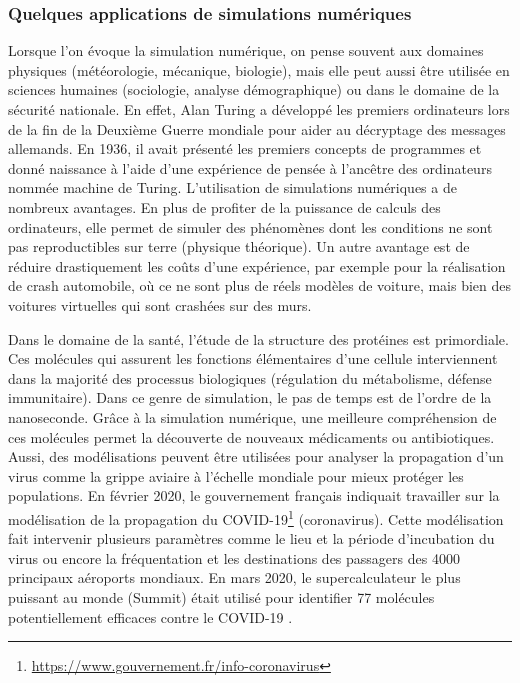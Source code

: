     \subsubsection{Quelques applications de simulations numériques}
        Lorsque l'on évoque la simulation numérique, on pense souvent aux domaines physiques (météorologie, mécanique, biologie), mais elle peut aussi être utilisée en sciences humaines (sociologie, analyse démographique) ou dans le domaine de la sécurité nationale. En effet, Alan Turing a développé les premiers ordinateurs lors de la fin de la Deuxième Guerre mondiale pour aider au décryptage des messages allemands. En 1936, il avait présenté les premiers concepts de programmes et donné naissance à l'aide d'une expérience de pensée à l'ancêtre des ordinateurs nommée machine de Turing. L'utilisation de simulations numériques a de nombreux avantages. En plus de profiter de la puissance de calculs des ordinateurs, elle permet de simuler des phénomènes dont les conditions ne sont pas reproductibles sur terre (physique théorique). Un autre avantage est de réduire drastiquement les coûts d'une expérience, par exemple pour la réalisation de crash automobile, où ce ne sont plus de réels modèles de voiture, mais bien des voitures virtuelles qui sont crashées sur des murs.
        
        Dans le domaine de la santé, l'étude de la structure des protéines est primordiale.  Ces molécules qui assurent les fonctions élémentaires d'une cellule interviennent dans la majorité des processus biologiques (régulation du métabolisme, défense immunitaire). Dans ce genre de simulation, le pas de temps est de l'ordre de la nanoseconde. Grâce à la simulation numérique, une meilleure compréhension de ces molécules permet la découverte de nouveaux médicaments ou antibiotiques. 
        Aussi, des modélisations peuvent être utilisées pour analyser la propagation d'un virus comme la grippe aviaire à l'échelle mondiale pour mieux protéger les populations\cite{CEA2007}. En février 2020, le gouvernement français indiquait travailler sur la modélisation de la propagation du COVID-19\footnote{\url{https://www.gouvernement.fr/info-coronavirus}} (coronavirus). Cette modélisation fait intervenir plusieurs paramètres comme le lieu et la période d'incubation du virus ou encore la fréquentation et les destinations des passagers des 4000 principaux aéroports mondiaux. En mars 2020, le supercalculateur le plus puissant au monde (Summit) était utilisé pour identifier 77 molécules potentiellement efficaces contre le COVID-19 \cite{Smith2020}.

